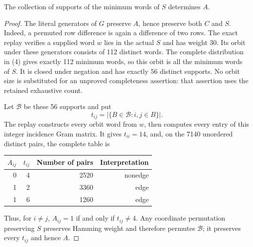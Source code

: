 \begin{lemma}\label{L050.120.support}
The collection of supports of the minimum words of $S$ determines $A$.
\end{lemma}
\begin{proof}
The literal generators of $G$ preserve $A$, hence preserve both $C$ and $S$. Indeed, a permuted row difference is again a difference of two rows. The exact replay verifies a supplied word $w$ lies in the actual $S$ and has weight 30. Its orbit under these generators consists of 112 distinct words. The complete distribution in (4) gives exactly 112 minimum words, so this orbit is all the minimum words of $S$. It is closed under negation and has exactly 56 distinct supports. No orbit size is substituted for an unproved completeness assertion: that assertion uses the retained exhaustive count.

Let $\mathcal B$ be these 56 supports and put
\[
 t_{ij}=|\{B\in\mathcal B:i,j\in B\}|.
\]
The replay constructs every orbit word from $w$, then computes every entry of this integer incidence Gram matrix. It gives $t_{ii}=14$, and, on the 7140 unordered distinct pairs, the complete table is
\begin{center}\begin{tabular}{rrrr}\toprule
$A_{ij}$&$t_{ij}$&Number of pairs&Interpretation\\\midrule
0&4&2520&nonedge\\
1&2&3360&edge\\
1&6&1260&edge\\\bottomrule
\end{tabular}\end{center}
Thus, for $i\ne j$, $A_{ij}=1$ if and only if $t_{ij}\ne4$. Any coordinate permutation preserving $S$ preserves Hamming weight and therefore permutes $\mathcal B$; it preserves every $t_{ij}$ and hence $A$.
\end{proof}

